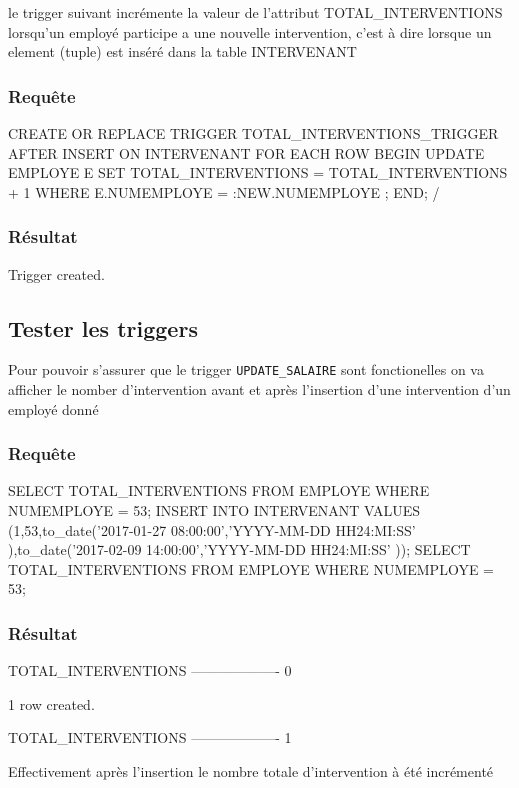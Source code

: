 \documentclass[•]{article}
\begin{document}
le trigger suivant incrémente la valeur de l'attribut TOTAL\_INTERVENTIONS lorsqu'un employé participe a une nouvelle intervention,
c'est à dire lorsque un element (tuple) est inséré dans la table INTERVENANT

\subsubsection{Requête}
\begin{sql}
CREATE OR REPLACE TRIGGER TOTAL_INTERVENTIONS_TRIGGER
AFTER INSERT ON INTERVENANT
FOR EACH ROW
BEGIN
	UPDATE EMPLOYE E
	SET TOTAL_INTERVENTIONS = TOTAL_INTERVENTIONS + 1 
	WHERE E.NUMEMPLOYE = :NEW.NUMEMPLOYE ;
END;
/
\end{sql}

\subsubsection{Résultat}
\begin{sql}
Trigger created.
\end{sql}

\subsection{Tester les triggers}
Pour pouvoir s'assurer que le trigger \texttt{UPDATE\_SALAIRE} sont fonctionelles on va afficher le nomber d'intervention avant et après l'insertion d'une intervention d'un employé donné


\subsubsection{Requête}
\begin{sql}
SELECT TOTAL_INTERVENTIONS FROM EMPLOYE WHERE NUMEMPLOYE = 53;
INSERT INTO INTERVENANT VALUES (1,53,to_date('2017-01-27 08:00:00','YYYY-MM-DD HH24:MI:SS' ),to_date('2017-02-09 14:00:00','YYYY-MM-DD HH24:MI:SS' ));
SELECT TOTAL_INTERVENTIONS FROM EMPLOYE WHERE NUMEMPLOYE = 53;
\end{sql}

\subsubsection{Résultat}
\begin{sql}
TOTAL_INTERVENTIONS
-------------------
                  0

1 row created.

TOTAL_INTERVENTIONS
-------------------
                  1
\end{sql}

Effectivement après l'insertion le nombre totale d'intervention à été incrémenté
\end{document}
